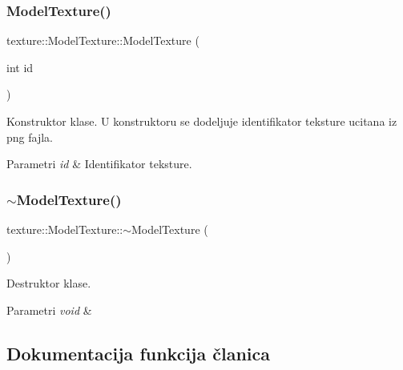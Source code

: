 \subsubsection{\texorpdfstring{Model\+Texture()}{Texture()}}
{\footnotesize\ttfamily texture\+::\+Model\+Texture\+::\+Model\+Texture (\begin{DoxyParamCaption}\item[{int}]{id }\end{DoxyParamCaption})}



Konstruktor klase. U konstruktoru se dodeljuje identifikator teksture ucitana iz png fajla. 


\begin{DoxyParams}{Parametri}
{\em id} & Identifikator teksture. \\
\hline
\end{DoxyParams}
\mbox{\label{classtexture_1_1Texture_ab0ce63043b8241b064a2c233ec24bfae}} 
\subsubsection{\texorpdfstring{$\sim$\+Model\+Texture()}{~Texture()}}
{\footnotesize\ttfamily texture\+::\+Model\+Texture\+::$\sim$\+Model\+Texture (\begin{DoxyParamCaption}{ }\end{DoxyParamCaption})}



Destruktor klase. 


\begin{DoxyParams}{Parametri}
{\em void} & \\
\hline
\end{DoxyParams}


\subsection{Dokumentacija funkcija članica}
\mbox{\label{classtexture_1_1Texture_adc0735b6b9c1df9f2c525f0663306cd3}} 
